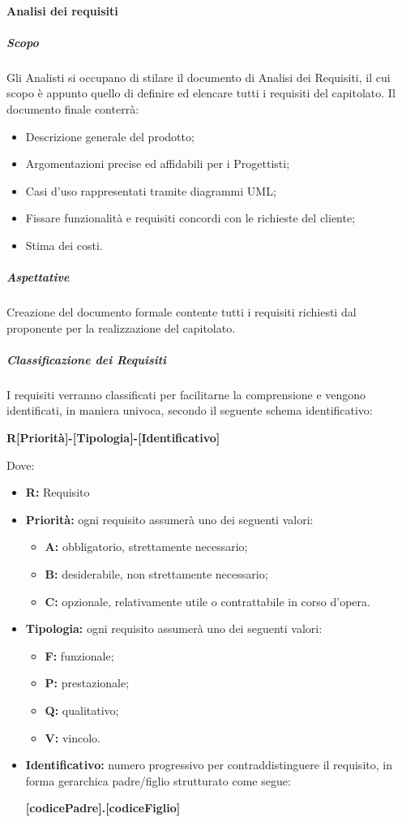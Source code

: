 			\paragraph{Analisi dei requisiti}
				\subparagraph{Scopo}
					Gli Analisti si occupano di stilare il documento di Analisi dei Requisiti, il cui scopo è appunto quello di definire ed elencare tutti i requisiti del capitolato. Il documento finale conterrà:
					\begin{itemize}
						\item Descrizione generale del prodotto;
						\item Argomentazioni precise ed affidabili per i Progettisti;
						\item Casi d'uso rappresentati tramite diagrammi UML;
						\item Fissare funzionalità e requisiti concordi con le richieste del cliente;
						\item Stima dei costi.
					\end{itemize}
				\subparagraph{Aspettative}
					Creazione del documento formale contente tutti i requisiti richiesti dal proponente per la realizzazione del capitolato.
				\subparagraph{Classificazione dei Requisiti}
					I requisiti verranno classificati per facilitarne la comprensione e vengono identificati, in maniera univoca, secondo il seguente schema identificativo:
					\begin{center}
						\textbf{R[Priorità]-[Tipologia]-[Identificativo]}
					\end{center}
					Dove:
					\begin{itemize}
						\item \textbf{R:} Requisito 
						\item \textbf{Priorità:} ogni requisito assumerà uno dei seguenti valori:
						\begin{itemize}
							\item \textbf{A:} obbligatorio, strettamente necessario;
							\item \textbf{B:} desiderabile, non strettamente necessario;
							\item \textbf{C:} opzionale, relativamente utile o contrattabile in corso d'opera.
						\end{itemize}
						\item \textbf{Tipologia:} ogni requisito assumerà uno dei seguenti valori:
						\begin{itemize}
							\item \textbf{F:} funzionale;
							\item \textbf{P:} prestazionale;
							\item \textbf{Q:} qualitativo;
							\item \textbf{V:} vincolo.
						\end{itemize}
						\item \textbf{Identificativo:} numero progressivo per contraddistinguere il requisito, in forma gerarchica padre/figlio strutturato come segue: 
						\begin{center}
							\textbf{[codicePadre].[codiceFiglio]}
						\end{center}
					\end{itemize}
